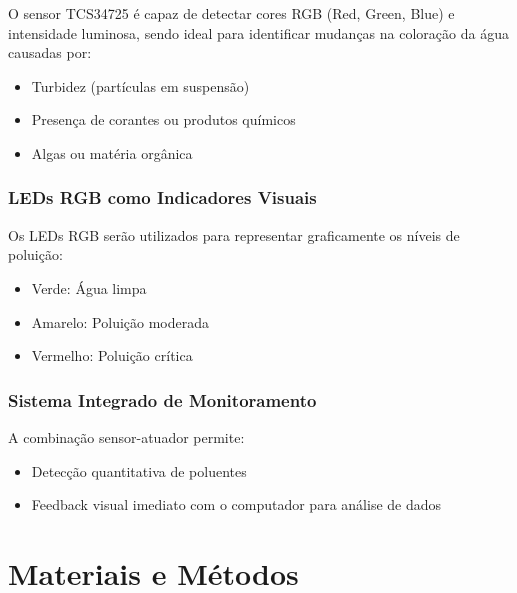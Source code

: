 \documentclass[12pt]{article}
\begin{document}
O sensor TCS34725 é capaz de detectar cores RGB (Red, Green, Blue) e intensidade luminosa, sendo ideal para identificar mudanças na coloração da água causadas por:

\begin{itemize}
    \item Turbidez (partículas em suspensão)
    \item Presença de corantes ou produtos químicos
    \item Algas ou matéria orgânica
\end{itemize}

\subsubsection{LEDs RGB como Indicadores Visuais}

Os LEDs RGB serão utilizados para representar graficamente os níveis de poluição:

\begin{itemize}
    \item Verde: Água limpa
    \item Amarelo: Poluição moderada
    \item Vermelho: Poluição crítica
\end{itemize}

\subsubsection{Sistema Integrado de Monitoramento}

A combinação sensor-atuador permite:
\begin{itemize}
    \item Detecção quantitativa de poluentes
    \item Feedback visual imediato
    \interface com o computador para análise de dados
\end{itemize}

\section{Materiais e Métodos}
\end{document}
